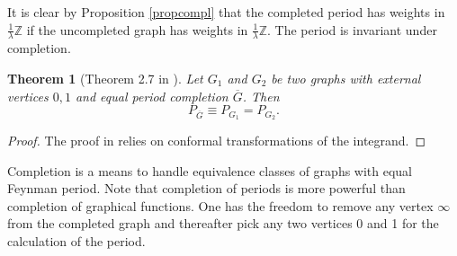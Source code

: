 \documentclass[oneside]{amsart}
\newcommand{\ZZ}{{\mathbb Z}}
\newcommand{\Gg}{{\overline{G}}}
\theoremstyle{plain}
\newtheorem{thm}{Theorem}
\begin{document}
It is clear by Proposition \ref{propcompl} that the completed period has weights in $\frac{1}{\lambda}\ZZ$ if the uncompleted graph has weights in $\frac{1}{\lambda}\ZZ$.
The period is invariant under completion.
\begin{thm}[Theorem 2.7 in \cite{Census}]\label{thmpercompl}
Let $G_1$ and $G_2$ be two graphs with external vertices $0,1$ and equal period completion $\Gg$. Then
\begin{equation}\label{eqperiodcompl}
P_\Gg\equiv P_{G_1}=P_{G_2}.
\end{equation}
\end{thm}
\begin{proof}
The proof in \cite{Census} relies on conformal transformations of the integrand.
\end{proof}

Completion is a means to handle equivalence classes of graphs with equal Feynman period. Note that completion of periods is more powerful than completion of graphical functions.
One has the freedom to remove any vertex $\infty$ from the completed graph and thereafter pick any two vertices 0 and 1 for the calculation of the period.
\end{document}
